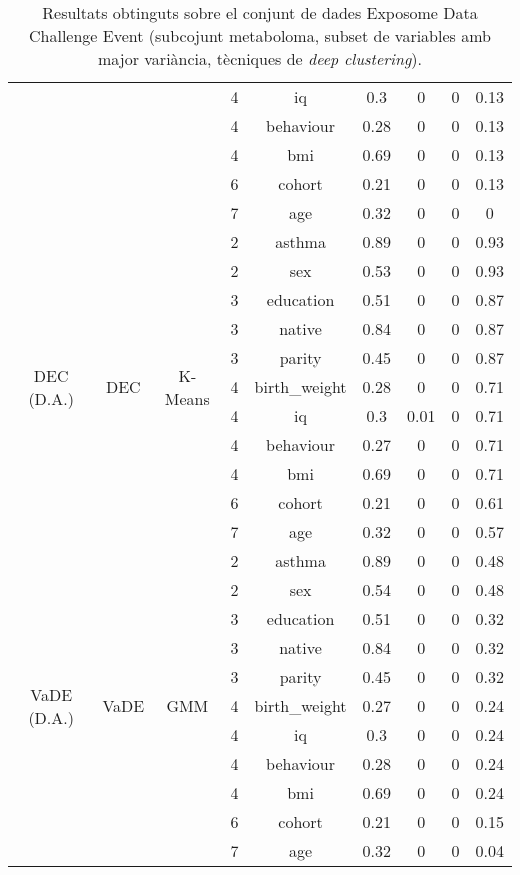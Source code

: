 \documentclass[CAT,BIB]{TFUOC}%
\begin{document}
\begin{table}
\begin{tabular}{@{}ccccccccc@{}}
            &  &  & 4 & iq & 0.3 & 0 & 0 & 0.13 \\
            &  &  & 4 & behaviour & 0.28 & 0 & 0 & 0.13 \\
            &  &  & 4 & bmi & 0.69 & 0 & 0 & 0.13 \\
            &  &  & 6 & cohort & 0.21 & 0 & 0 & 0.13 \\
            &  &  & 7 & age & 0.32 & 0 & 0 & 0 \\ \midrule
            \multirow{11}{*}{DEC (D.A.)} & \multirow{11}{*}{DEC} & \multirow{11}{*}{K-Means} & 2 & asthma & 0.89 & 0 & 0 & 0.93 \\
            &  &  & 2 & sex & 0.53 & 0 & 0 & 0.93 \\
            &  &  & 3 & education & 0.51 & 0 & 0 & 0.87 \\
            &  &  & 3 & native & 0.84 & 0 & 0 & 0.87 \\
            &  &  & 3 & parity & 0.45 & 0 & 0 & 0.87 \\
            &  &  & 4 & birth\_weight & 0.28 & 0 & 0 & 0.71 \\
            &  &  & 4 & iq & 0.3 & 0.01 & 0 & 0.71 \\
            &  &  & 4 & behaviour & 0.27 & 0 & 0 & 0.71 \\
            &  &  & 4 & bmi & 0.69 & 0 & 0 & 0.71 \\
            &  &  & 6 & cohort & 0.21 & 0 & 0 & 0.61 \\
            &  &  & 7 & age & 0.32 & 0 & 0 & 0.57 \\ \midrule
            \multirow{11}{*}{VaDE (D.A.)} & \multirow{11}{*}{VaDE} & \multirow{11}{*}{GMM} & 2 & asthma & 0.89 & 0 & 0 & 0.48 \\
            &  &  & 2 & sex & 0.54 & 0 & 0 & 0.48 \\
            &  &  & 3 & education & 0.51 & 0 & 0 & 0.32 \\
            &  &  & 3 & native & 0.84 & 0 & 0 & 0.32 \\
            &  &  & 3 & parity & 0.45 & 0 & 0 & 0.32 \\
            &  &  & 4 & birth\_weight & 0.27 & 0 & 0 & 0.24 \\
            &  &  & 4 & iq & 0.3 & 0 & 0 & 0.24 \\
            &  &  & 4 & behaviour & 0.28 & 0 & 0 & 0.24 \\
            &  &  & 4 & bmi & 0.69 & 0 & 0 & 0.24 \\
            &  &  & 6 & cohort & 0.21 & 0 & 0 & 0.15 \\
            &  &  & 7 & age & 0.32 & 0 & 0 & 0.04 \\ \bottomrule
        \end{tabular}
        \caption[Exposome Data Challenge Event: resultats - part 4]{
            Resultats obtinguts sobre el conjunt de dades Exposome Data Challenge Event
            (subcojunt metaboloma, subset de variables amb major variància, tècniques de \textit{deep clustering}).
        }
        \label{t:results_exposome4}
    \end{table}
\end{document}
